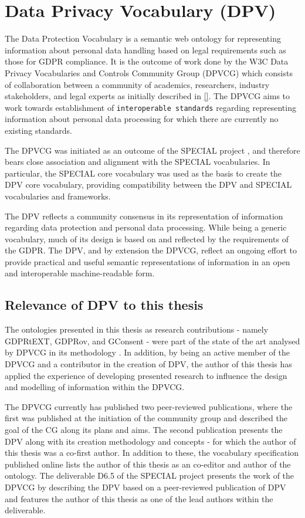\section{Data Privacy Vocabulary (DPV)}\label{sec:voc:DPV}
The Data Protection Vocabulary is a semantic web ontology for representing information about personal data handling based on legal requirements such as those for GDPR compliance.
It is the outcome of work done by the W3C Data Privacy Vocabularies and Controls Community Group (DPVCG) which consists of collaboration between a community of academics, researchers, industry stakeholders, and legal experts as initially described in \autoref{}.
The DPVCG aims to work towards establishment of \texttt{interoperable standards} regarding representing information about personal data processing for which there are currently no existing standards.

The DPVCG was initiated as an outcome of the SPECIAL project \cite{}, and therefore bears close association and alignment with the SPECIAL vocabularies.
In particular, the SPECIAL core vocabulary was used as the basis to create the DPV core vocabulary, providing compatibility between the DPV and SPECIAL vocabularies and frameworks.

The DPV reflects a community consensus in its representation of information regarding data protection and personal data processing. While being a generic vocabulary, much of its design is based on and reflected by the requirements of the GDPR. The DPV, and by extension the DPVCG, reflect an ongoing effort to provide practical and useful semantic representations of information in an open and interoperable machine-readable form. 

\subsection{Relevance of DPV to this thesis}
The ontologies presented in this thesis as research contributions - namely GDPRtEXT, GDPRov, and GConsent - were part of the state of the art analysed by DPVCG in its methodology \cite{}.
In addition, by being an active member of the DPVCG and a contributor in the creation of DPV, the author of this thesis has applied the experience of developing presented research to influence the design and modelling of information within the DPVCG.

The DPVCG currently has published two peer-reviewed publications, where the first \cite{} was published at the initiation of the community group and described the goal of the CG along its plans and aims. The second publication \cite{} presents the DPV along with its creation methodology and concepts - for which the author of this thesis was a co-first author.
In addition to these, the vocabulary specification published online lists the author of this thesis as an co-editor and author of the ontology.
The deliverable D6.5 \cite{} of the SPECIAL project presents the work of the DPVCG by describing the DPV based on a peer-reviewed publication of DPV \cite{} and features the author of this thesis as one of the lead authors within the deliverable.

